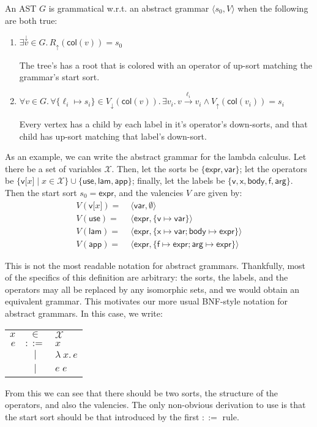 \documentclass[11pt]{article} %
\theoremstyle{definition}
\newcommand{\fn}{\lambda\:\!}
\begin{document}
An AST $G$ is grammatical w.r.t. an abstract grammar $\langle s_0, V \rangle$ when the following are both true:
\begin{enumerate}
    \item $\exists \overset\downarrow v \in G.\,
            R_\uparrow(\mathsf{col}(v)) = s_0$

        The tree's has a root that is colored with an operator of up-sort matching the grammar's start sort.

    \item $\forall v \in G.\,
            \forall \{\ell_i \mapsto s_i\} \in V_\downarrow(\mathsf{col}(v)).\,
            \exists v_i.\,
            v \overset{\ell_i}\to v_i \land V_\uparrow(\mathsf{col}(v_i)) = s_i$

        Every vertex has a child by each label in it's operator's down-sorts, and that child has up-sort matching that label's down-sort.
\end{enumerate}

As an example, we can write the abstract grammar for the lambda calculus.
Let there be a set of variables $\mathcal{X}$.
Then, let the sorts be $\{\mathsf{expr}, \mathsf{var}\}$;
let the operators be $\{\mathsf{v[}x\mathsf{]} \mid x \in \mathcal X\} \cup \{\mathsf{use}, \mathsf{lam}, \mathsf{app}\}$;
finally, let the labels be $\{\mathsf{v}, \mathsf{x}, \mathsf{body}, \mathsf{f}, \mathsf{arg}\}$.
Then the start sort $s_0 = \mathsf{expr}$, and the valencies $V$ are given by:
\begin{align*}
    V(\mathsf{v[}x\mathsf{]}) =\;& \langle \mathsf{var}, \emptyset \rangle \\
    V(\mathsf{use}) =\;& \langle \mathsf{expr}, \{\mathsf{v} \mapsto \mathsf{var} \} \rangle \\
    V(\mathsf{lam}) =\;& \langle \mathsf{expr}, \{\mathsf{x} \mapsto \mathsf{var}; \mathsf{body} \mapsto \mathsf{expr} \} \rangle \\
    V(\mathsf{app}) =\;& \langle \mathsf{expr}, \{\mathsf{f} \mapsto \mathsf{expr}; \mathsf{arg} \mapsto \mathsf{expr}\} \rangle
\end{align*}

This is not the most readable notation for abstract grammars.
Thankfully, most of the specifics of this definition are arbitrary: the sorts, the labels, and the operators may all be replaced by any isomorphic sets, and we would obtain an equivalent grammar.
This motivates our more usual BNF-style notation for abstract grammars.
In this case, we write: \newline
\begin{tabular}{rcl}
$x$ & $\in$ & $\mathcal{X}$ \\
$e$ & $::=$ & $x$ \\
    & $\mid$ & $\fn x.\, e$ \\
    & $\mid$ & $e\;e$ \\
\end{tabular}
\newline
From this we can see that there should be two sorts, the structure of the operators, and also the valencies.
The only non-obvious derivation to use is that the start sort should be that introduced by the first $::=$ rule.
\end{document}
